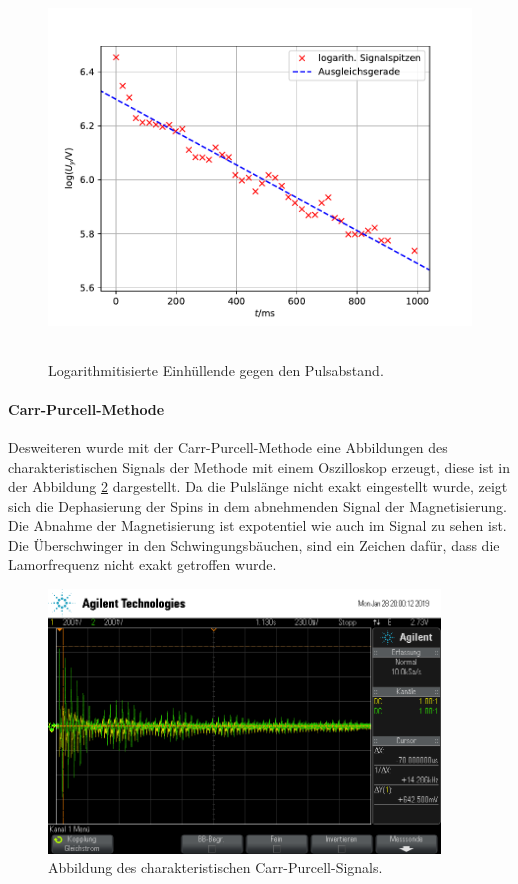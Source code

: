 \begin{figure}
  \centering
  \includegraphics[height = 10cm]{plots/T2plot.pdf}
  \caption{Logarithmitisierte Einhüllende gegen den Pulsabstand.}
  \label{fig:T2}
\end{figure}
\FloatBarrier
\paragraph{Carr-Purcell-Methode}
Desweiteren wurde mit der Carr-Purcell-Methode eine Abbildungen des charakteristischen Signals der Methode mit einem 
Oszilloskop erzeugt, diese ist in der Abbildung \ref{fig:PCM} dargestellt. Da die Pulslänge nicht exakt 
eingestellt wurde, zeigt sich die Dephasierung der Spins in dem abnehmenden Signal 
der Magnetisierung. Die Abnahme der Magnetisierung ist expotentiel wie auch im Signal zu sehen ist. 
Die Überschwinger in den Schwingungsbäuchen, sind ein Zeichen dafür, dass die Lamorfrequenz 
nicht exakt getroffen wurde.
\begin{figure}
  \centering
  \includegraphics[height = 7cm]{plots/scope_3.png}
  \caption{Abbildung des charakteristischen Carr-Purcell-Signals.}
  \label{fig:PCM}
\end{figure}
\FloatBarrier
